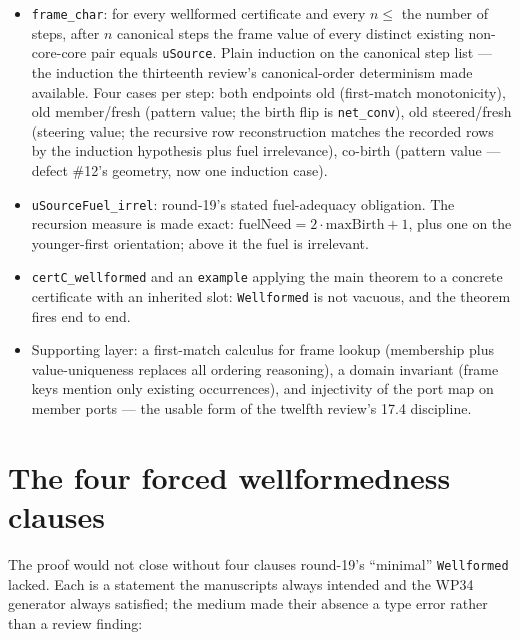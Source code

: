 \documentclass[11pt]{article}
\newcommand{\code}[1]{\texttt{#1}}
\begin{document}
\begin{itemize}[leftmargin=2em]
\item \code{frame\_char}: for every wellformed certificate and every
$n \le$ the number of steps, after $n$ canonical steps the frame value
of every distinct existing non-core-core pair equals \code{uSource}.
Plain induction on the canonical step list --- the induction the
thirteenth review's canonical-order determinism made available.  Four
cases per step: both endpoints old (first-match monotonicity), old
member/fresh (pattern value; the birth flip is
\code{net\_conv}), old steered/fresh (steering value; the recursive
row reconstruction matches the recorded rows by the induction
hypothesis plus fuel irrelevance), co-birth (pattern value --- defect
\#12's geometry, now one induction case).
\item \code{uSourceFuel\_irrel}: round-19's stated fuel-adequacy
obligation.  The recursion measure is made exact:
$\mathrm{fuelNeed} = 2\cdot\mathrm{maxBirth}+1$, plus one on the
younger-first orientation; above it the fuel is irrelevant.
\item \code{certC\_wellformed} and an \code{example} applying the
main theorem to a concrete certificate with an inherited slot:
\code{Wellformed} is not vacuous, and the theorem fires end to end.
\item Supporting layer: a first-match calculus for frame lookup
(membership plus value-uniqueness replaces all ordering reasoning), a
domain invariant (frame keys mention only existing occurrences), and
injectivity of the port map on member ports --- the usable form of the
twelfth review's 17.4 discipline.
\end{itemize}

\section{The four forced wellformedness clauses}

The proof would not close without four clauses round-19's ``minimal''
\code{Wellformed} lacked.  Each is a statement the manuscripts always
intended and the WP34 generator always satisfied; the medium made
their absence a type error rather than a review finding:
\end{document}
